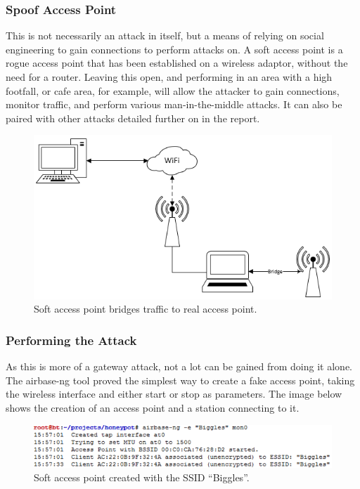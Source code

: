 \subsubsection{Spoof Access Point}
\label{sec:spoofap}
This is not necessarily an attack in itself, but a means of relying on social engineering to gain connections to perform attacks on. A soft access point is a rogue access point that has been established on a wireless adaptor, without the need for a router. Leaving this open, and performing in an area with a high footfall, or cafe area, for example, will allow the attacker to gain connections, monitor traffic, and perform various man-in-the-middle attacks. It can also be paired with other attacks detailed further on in the report.

\begin{figure}[h!]
\includegraphics[width=\linewidth]{research/figures/spoofap.png}
\caption{Soft access point bridges traffic to real access point.}
\end{figure}

\subsubsection*{Performing the Attack}
As this is more of a gateway attack, not a lot can be gained from doing it alone. The airbase-ng tool proved the simplest way to create a fake access point, taking the wireless interface and either start or stop as parameters. The image below shows the creation of an access point and a station connecting to it.

\begin{figure}[h!]
\includegraphics[width=\linewidth]{research/attackvectors/figures/spoofap1.png}
\caption{Soft access point created with the SSID “Biggles”.}
\end{figure}